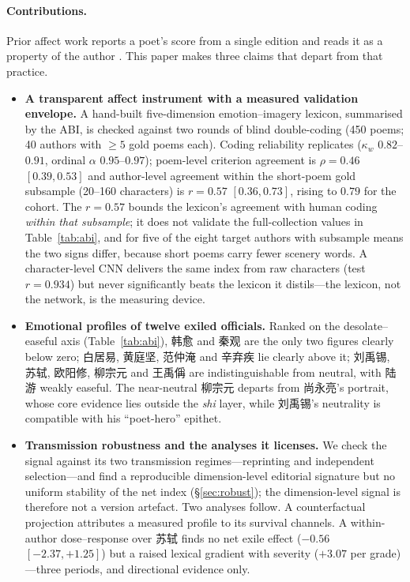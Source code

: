 \documentclass[10pt]{article}
\begin{document}
\paragraph{Contributions.} Prior affect work reports a poet's score from a single
edition and reads it as a property of the author
\citep{hou2015sentiment,du2025multimodal}. This paper makes three claims that depart
from that practice.
\begin{itemize}
\item \textbf{A transparent affect instrument with a measured validation envelope.} A
hand-built five-dimension emotion--imagery lexicon, summarised by the ABI, is checked
against two rounds of blind double-coding (450 poems; 40 authors with $\ge5$ gold
poems each). Coding reliability replicates ($\kappa_w$ $0.82$--$0.91$, ordinal
$\alpha$ $0.95$--$0.97$); poem-level criterion agreement is $\rho{=}0.46$
$[0.39,0.53]$ and author-level agreement within the short-poem gold subsample
(20--160 characters) is $r{=}0.57$ $[0.36,0.73]$, rising to $0.79$ for the cohort.
The $r{=}0.57$ bounds the lexicon's agreement with human coding \emph{within that
subsample}; it does not validate the full-collection values in Table~\ref{tab:abi},
and for five of the eight target authors with subsample means the two signs differ,
because short poems carry fewer scenery words. A character-level CNN delivers the
same index from raw characters (test $r{=}0.934$) but never significantly beats the
lexicon it distils---the lexicon, not the network, is the measuring device.

\item \textbf{Emotional profiles of twelve exiled officials.} Ranked on the
desolate--easeful axis (Table~\ref{tab:abi}), 韩愈 and 秦观 are the only two figures
clearly below zero; 白居易, 黄庭坚, 范仲淹 and 辛弃疾 lie clearly above it; 刘禹锡,
苏轼, 欧阳修, 柳宗元 and 王禹偁 are indistinguishable from neutral, with 陆游 weakly
easeful. The near-neutral 柳宗元 departs from 尚永亮's portrait, whose core evidence
lies outside the \emph{shi} layer, while 刘禹锡's neutrality is compatible with his
``poet-hero'' epithet.

\item \textbf{Transmission robustness and the analyses it licenses.} We check the
signal against its two transmission regimes---reprinting and independent
selection---and find a reproducible dimension-level editorial signature but no
uniform stability of the net index (\S\ref{sec:robust}); the dimension-level signal
is therefore not a version artefact. Two analyses follow. A counterfactual projection
attributes a measured profile to its survival channels. A within-author dose--response
over 苏轼 finds no net exile effect ($-0.56$ $[-2.37,+1.25]$) but a raised lexical
gradient with severity ($+3.07$ per grade)---three periods, and directional evidence
only.
\end{itemize}
\end{document}
